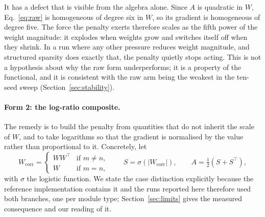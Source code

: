 \documentclass[11pt,a4paper]{article}
\begin{document}
It has a defect that is visible from the algebra alone. Since $A$ is quadratic
in $W$, Eq.~\ref{eq:raw} is homogeneous of degree six in $W$, so its gradient
is homogeneous of degree five. The force the penalty exerts therefore scales
as the fifth power of the weight magnitude: it explodes when weights grow and
switches itself off when they shrink. In a run where any other pressure
reduces weight magnitude, and structured sparsity does exactly that, the
penalty quietly stops acting. This is not a hypothesis about why the raw form
underperforms; it is a property of the functional, and it is consistent with
the raw arm being the weakest in the ten-seed sweep
(Section~\ref{sec:stability}).

\paragraph{Form 2: the log-ratio composite.} The remedy is to build the
penalty from quantities that do not inherit the scale of $W$, and to take
logarithms so that the gradient is normalised by the value rather than
proportional to it. Concretely, let
\begin{equation}
  W_{\text{corr}} =
  \begin{cases}
    WW^\top & \text{if } m \neq n,\\
    W & \text{if } m = n,
  \end{cases}
  \qquad
  S = \sigma\!\left(|W_{\text{corr}}|\right),
  \qquad
  A = \tfrac{1}{2}\left(S + S^\top\right),
\label{eq:construction}
\end{equation}
with $\sigma$ the logistic function. We state the case distinction explicitly
because the reference implementation contains it and the runs reported here
therefore used both branches, one per module type; Section~\ref{sec:limits}
gives the measured consequence and our reading of it.
\end{document}
